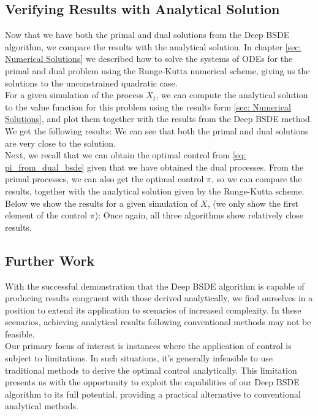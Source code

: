 \subsection{Verifying Results with Analytical Solution}
Now that we have both the primal and dual solutions from the Deep BSDE algorithm, we compare the results with the analytical solution. In chapter \ref{sec: Numerical Solutions} we described how to solve the systems of ODEs for the primal and dual problem using the Runge-Kutta numerical scheme, giving us the solutions to the unconstrained quadratic case.\\

For a given simulation of the process $X_t$, we can compute the analytical solution to the value function for this problem using the results form \ref{sec: Numerical Solutions}, and plot them together with the results from the Deep BSDE method. We get the following results:
We can see that both the primal and dual solutions are very close to the solution. \\

Next, we recall that we can obtain the optimal control from \eqref{eq: pi_from_dual_bsde} given that we have obtained the dual processes. From the primal processes, we can also get the optimal control $\pi$, so we can compare the results, together with the analytical solution given by the Runge-Kutta scheme. Below we show the results for a given simulation of $X$, (we only show the first element of the control $\pi$):
Once again, all three algorithms show relatively close results.

\subsection{Further Work}
With the successful demonstration that the Deep BSDE algorithm is capable of producing results congruent with those derived analytically, we find ourselves in a position to extend its application to scenarios of increased complexity. In these scenarios, achieving analytical results following conventional methods may not be feasible.\\

Our primary focus of interest is instances where the application of control is subject to limitations. In such situations, it's generally infeasible to use traditional methods to derive the optimal control analytically. This limitation presents us with the opportunity to exploit the capabilities of our Deep BSDE algorithm to its full potential, providing a practical alternative to conventional analytical methods.\\


